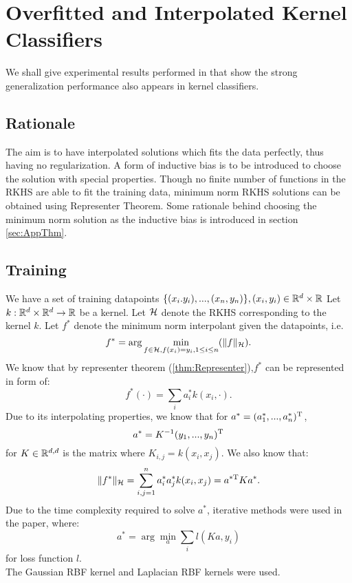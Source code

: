 \documentclass[twoside]{memoir}
\begin{document}
\chapter{Overfitted and Interpolated Kernel Classifiers}
We shall give experimental results performed in \cite{UnderstandKernel} that show the strong generalization performance also appears in kernel classifiers.
\section{Rationale}
The aim is to have interpolated solutions which fits the data perfectly, thus having no regularization. A form of inductive bias is to be introduced to choose the solution with special properties. Though no finite number of functions in the RKHS are able to fit the training data, minimum norm RKHS solutions can be obtained using Representer Theorem. Some rationale behind choosing the minimum norm solution as the inductive bias is introduced in section \ref{sec:AppThm}.
\section{Training}
We have a set of training datapoints $\{ (x_i. y_i), ..., (x_n, y_n) \}, (x_i, y_i) \in \mathbb{R}^d \times \mathbb{R}$
Let $k: \mathbb{R}^d \times \mathbb{R}^d \rightarrow \mathbb{R}$ be a kernel. Let $\mathcal{H}$ denote the RKHS corresponding to the kernel $k$. Let $f^*$ denote the minimum norm interpolant given the datapoints, i.e.
\begin{equation*}
f^* = \arg \min_{f \in \mathcal{H}, f(x_i) = y_i, 1 \leq i \leq n} (\lVert f\rVert_{\mathcal{H}}).
\end{equation*}
We know that by representer theorem (\ref{thm:Representer}),$f^*$ can be represented in form of:
\[ f^*(\cdot) = \sum_{i} a^*_i k(x_i, \cdot). \]
Due to its interpolating properties, we know that for $a^* = (a^*_1, ..., a^*_n)^{\text{T}}$,
\begin{equation} \label{eqn:interpolation_solution}
a^* = K^{-1} (y_1, ..., y_n)^{\text{T}}
\end{equation}
for $K \in \mathbb{R}^{d,d}$ is the matrix where $K_{i,j} = k(x_i, x_j)$.
We also know that:
\[ \lVert f^*\rVert_{\mathcal{H}} = \sum_{i,j=1}^{n} a^*_i a^*_j k(x_i, x_j) = a^{*\text{T}} K a^*. \]
Due to the time complexity required to solve $a^*$, iterative methods were used in the paper, where:
\begin{equation*}
a^* = \arg \min_{a} \sum_{i} l(Ka, y_i)
\end{equation*}
for loss function $l$.\\
The Gaussian RBF kernel and Laplacian RBF kernels were used.
\end{document}
